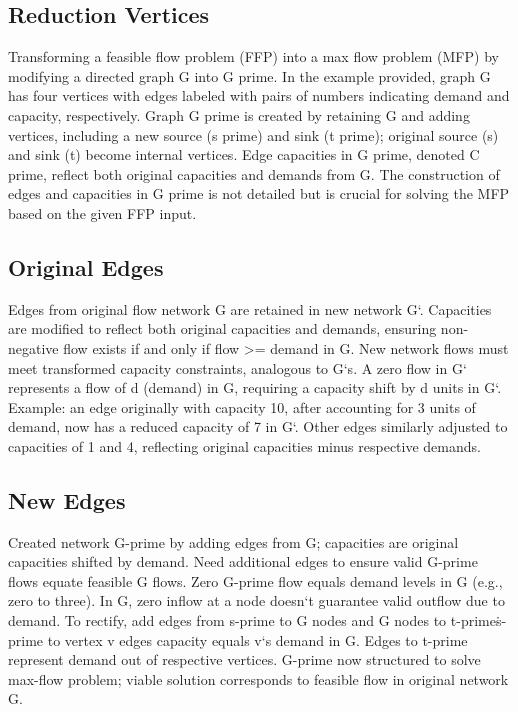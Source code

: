 \subsection*{Reduction  Vertices}
Transforming a feasible flow problem (FFP) into a max flow problem (MFP) by modifying a directed graph G into G prime.
In the example provided, graph G has four vertices with edges labeled with pairs of numbers indicating demand and capacity, respectively.
Graph G prime is created by retaining G and adding vertices, including a new source (s prime) and sink (t prime); original source (s) and sink (t) become internal vertices.
Edge capacities in G prime, denoted C prime, reflect both original capacities and demands from G\@.
The construction of edges and capacities in G prime is not detailed but is crucial for solving the MFP based on the given FFP input.

\subsection*{Original Edges}
Edges from original flow network G are retained in new network G`.
Capacities are modified to reflect both original capacities and demands, ensuring non-negative flow exists if and only if flow \textgreater{}= demand in G\@.
New network flows must meet transformed capacity constraints, analogous to G`s.
A zero flow in G` represents a flow of d (demand) in G, requiring a capacity shift by d units in G`.
Example: an edge originally with capacity 10, after accounting for 3 units of demand, now has a reduced capacity of 7 in G`.
Other edges similarly adjusted to capacities of 1 and 4, reflecting original capacities minus respective demands.

\subsection*{New Edges}
Created network G-prime by adding edges from G; capacities are original capacities shifted by demand.
Need additional edges to ensure valid G-prime flows equate feasible G flows.
Zero G-prime flow equals demand levels in G (e.g., zero to three).
In G, zero inflow at a node doesn`t guarantee valid outflow due to demand.
To rectify, add edges from s-prime to G nodes and G nodes to t-prime\. s-prime to vertex v edges capacity equals v`s demand in G\@.
Edges to t-prime represent demand out of respective vertices.
G-prime now structured to solve max-flow problem; viable solution corresponds to feasible flow in original network G\@.

